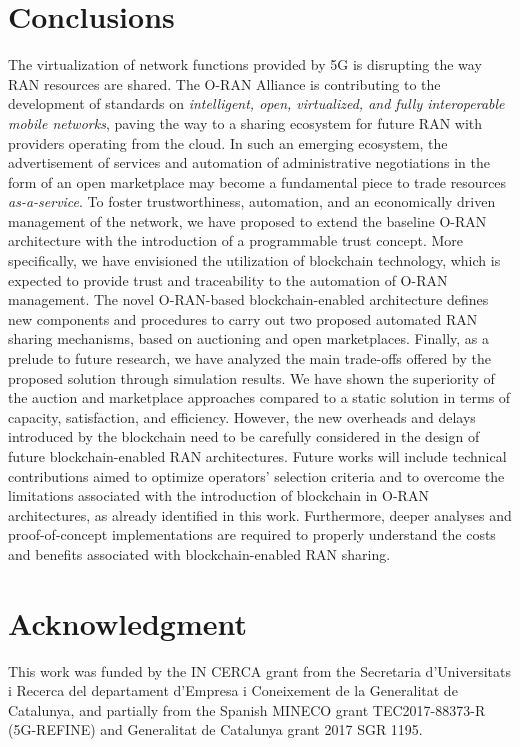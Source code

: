 \documentclass[journal]{IEEEtran}
\begin{document}
	\section{Conclusions}
	\label{section:conclusions}
	
	The virtualization of network functions provided by 5G is disrupting the way RAN resources are shared. The O-RAN Alliance is contributing to the development of standards on \textit{intelligent, open, virtualized, and fully interoperable mobile networks}, paving the way to a sharing ecosystem for future RAN with providers operating from the cloud. In such an emerging ecosystem, the advertisement of services and automation of administrative negotiations in the form of an open marketplace may become a fundamental piece to trade resources \textit{as-a-service}. To foster trustworthiness, automation, and an economically driven management of the network, we have proposed to extend the baseline O-RAN architecture with the introduction of a programmable trust concept. More specifically, we have envisioned the utilization of blockchain technology, which is expected to provide trust and traceability to the automation of O-RAN management. The novel O-RAN-based blockchain-enabled architecture defines new components and procedures to carry out two proposed automated RAN sharing mechanisms, based on auctioning and open marketplaces. Finally, as a prelude to future research, we have analyzed the main trade-offs offered by the proposed solution through simulation results. We have shown the superiority of the auction and marketplace approaches compared to a static solution in terms of capacity, satisfaction, and efficiency. However, the new overheads and delays introduced by the blockchain need to be carefully considered in the design of future blockchain-enabled RAN architectures. Future works will include technical contributions aimed to optimize operators' selection criteria and to overcome the limitations associated with the introduction of blockchain in O-RAN architectures, as already identified in this work. Furthermore, deeper analyses and proof-of-concept implementations are required to properly understand the costs and benefits associated with blockchain-enabled RAN sharing.
	
	\section*{Acknowledgment}
	This work was funded by the IN CERCA grant from the Secretaria d'Universitats i Recerca del departament d'Empresa i Coneixement de la Generalitat de Catalunya, and partially from the Spanish MINECO grant TEC2017-88373-R (5G-REFINE) and Generalitat de Catalunya grant 2017 SGR 1195.
	
\end{document}
